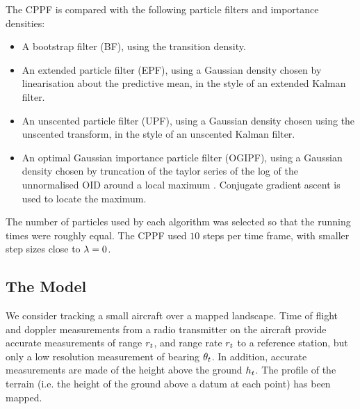 \documentclass[conference]{IEEEtran}
\begin{document}
The CPPF is compared with the following particle filters and importance densities:
\begin{itemize}
	\item A bootstrap filter (BF), using the transition density.
	\item An extended particle filter (EPF), using a Gaussian density chosen by linearisation about the predictive mean, in the style of an extended Kalman filter.
	\item An unscented particle filter (UPF), using a Gaussian density chosen using the unscented transform, in the style of an unscented Kalman filter.
	\item An optimal Gaussian importance particle filter (OGIPF), using a Gaussian density chosen by truncation of the taylor series of the log of the unnormalised OID around a local maximum \cite{Doucet2000a}. Conjugate gradient ascent is used to locate the maximum.
\end{itemize}

The number of particles used by each algorithm was selected so that the running times were roughly equal. The CPPF used $10$ steps per time frame, with smaller step sizes close to $\lambda=0$.

\subsection{The Model}

We consider tracking a small aircraft over a mapped landscape. Time of flight and doppler measurements from a radio transmitter on the aircraft provide accurate measurements of range $r_{t}$, and range rate $r_{t}$ to a reference station, but only a low resolution measurement of bearing $\theta_{t}$. In addition, accurate measurements are made of the height above the ground $h_{t}$. The profile of the terrain (i.e. the height of the ground above a datum at each point) has been mapped.
\end{document}
